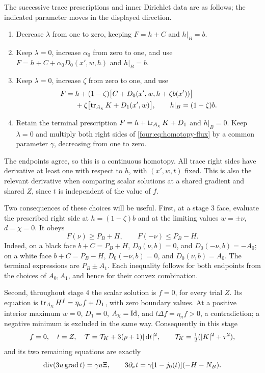The successive trace prescriptions and inner Dirichlet data are as
follows; the indicated parameter moves in the displayed direction.
\begin{enumerate}[label=\textup{Stage \arabic*:},leftmargin=*]
\item Decrease $\lambda$ from one to zero, keeping
      $F=h+C$ and $h|_B=b$.
\item Keep $\lambda=0$, increase $\alpha_0$ from zero to one, and use
      $F=h+C+\alpha_0D_0(x',w,h)$ and $h|_B=b$.
\item Keep $\lambda=0$, increase $\zeta$ from zero to one, and use
\begin{equation}\label{four:sys:trace-prescriptions}
\begin{aligned}
 F={}&h+(1-\zeta)\bigl[C+D_0(x',w,h+\zeta b(x'))\bigr]\\
    &+\zeta\bigl[\operatorname{tr}_{A_\chi}K+D_1(x',w)\bigr],
 \qquad h|_B=(1-\zeta)b.
\end{aligned}
\end{equation}
\item Retain the terminal prescription
      $F=h+\operatorname{tr}_{A_\chi}K+D_1$ and $h|_B=0$.  Keep $\lambda=0$ and
      multiply both right sides of \eqref{four:eq:homotopy-flux} by a common
      parameter $\gamma$, decreasing from one to zero.
\end{enumerate}
The endpoints agree, so this is a continuous homotopy.  All trace right
sides have derivative at least one with respect to $h$, with $(x',w,t)$
fixed.  This is also the relevant derivative when comparing scalar
solutions at a shared gradient and shared $Z$, since $t$ is independent
of the value of $f$.

Two consequences of these choices will be useful.  First, at a stage 3
face, evaluate the prescribed right side at $h=(1-\zeta)b$ and at the
limiting values $w=\pm\nu$, $d=\chi=0$.  It obeys
\begin{equation}\label{four:sys:direction-inequalities}
 F(\nu)\ge P_B+H,\qquad F(-\nu)\le P_B-H.
\end{equation}
Indeed, on a black face $b+C=P_B+H$, $D_0(\nu,b)=0$, and
$D_0(-\nu,b)=-A_0$; on a white face $b+C=P_B-H$,
$D_0(-\nu,b)=0$, and $D_0(\nu,b)=A_0$.  The terminal expressions are
$P_B\pm A_1$.  Each inequality follows for both endpoints from the
choices of $A_0,A_1$, and hence for their convex combination.

Second, throughout stage 4 the scalar solution is $f=0$, for every trial
$Z$.  Its equation is
$\operatorname{tr}_{A_\chi}H^f=\eta_n f+D_1$, with zero boundary values.  At a
positive interior maximum $w=0$, $D_1=0$, $A_\chi=\operatorname{Id}$, and
$l\Delta f=\eta_n f>0$, a contradiction; a negative minimum is
excluded in the same way.  Consequently in this stage
\begin{equation}\label{four:sys:terminal-system}
 f=0,\quad t=Z,\quad
 \mathcal T=\mathcal T_K+3(p+1)|\,\mathrm d t|^2,\qquad
 \mathcal T_K=\tfrac12(|K|^2+\tau^2),
\end{equation}
and its two remaining equations are exactly
\[
 \operatorname{div}(3u\operatorname{grad} t)=\gamma u\Xi,\qquad
 3\partial_\nu t=\gamma[1-j_0(t)](-H-N_B).
\]

